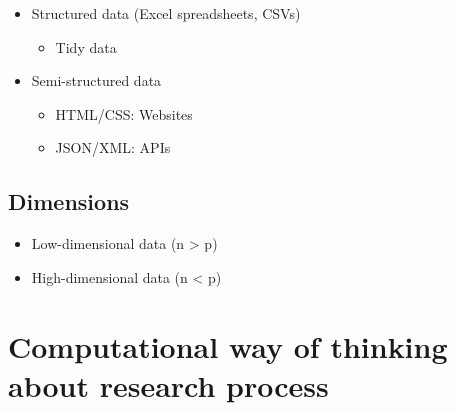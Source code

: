 \documentclass[
]{book}
\providecommand{\tightlist}{%
  \setlength{\itemsep}{0pt}\setlength{\parskip}{0pt}}
\begin{document}
\begin{itemize}
\tightlist
\item
  Structured data (Excel spreadsheets, CSVs)

  \begin{itemize}
  \tightlist
  \item
    Tidy data
  \end{itemize}
\item
  Semi-structured data

  \begin{itemize}
  \tightlist
  \item
    HTML/CSS: Websites
  \item
    JSON/XML: APIs
  \end{itemize}
\end{itemize}

\hypertarget{dimensions}{%
\subsection{Dimensions}\label{dimensions}}

\begin{itemize}
\tightlist
\item
  Low-dimensional data (n \textgreater{} p)
\item
  High-dimensional data (n \textless{} p)
\end{itemize}

\hypertarget{computational-way-of-thinking-about-research-process}{%
\section{Computational way of thinking about research process}\label{computational-way-of-thinking-about-research-process}}
\end{document}
